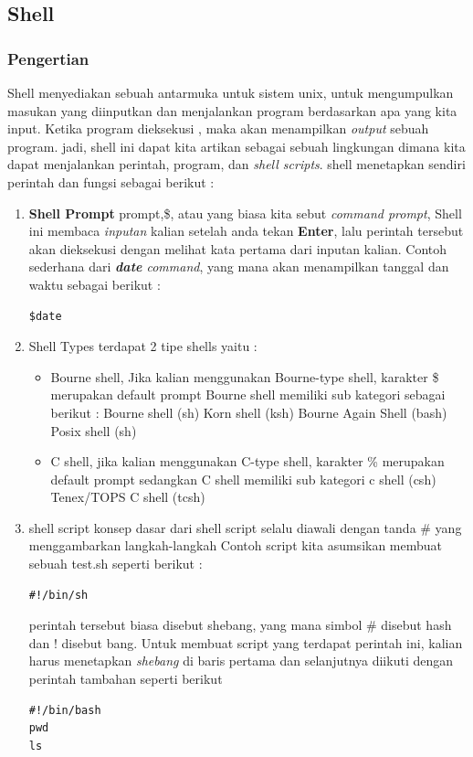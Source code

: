 \subsection{Shell}
\subsubsection{Pengertian}
Shell menyediakan sebuah antarmuka untuk sistem unix, untuk mengumpulkan masukan yang diinputkan dan menjalankan program berdasarkan apa yang kita input. Ketika program dieksekusi , maka akan menampilkan \textit{output} sebuah program. 
jadi, shell ini dapat kita artikan sebagai sebuah lingkungan dimana kita dapat menjalankan perintah, program, dan \textit{shell scripts}.
shell menetapkan sendiri perintah dan fungsi sebagai berikut :
\begin{enumerate}
\item \textbf{Shell Prompt}
prompt,\$, atau yang biasa kita sebut \textit{command prompt}, Shell ini membaca \textit{inputan} kalian setelah anda tekan \textbf{Enter}, lalu perintah tersebut akan dieksekusi dengan melihat kata pertama dari inputan kalian.
Contoh sederhana dari \textit{\textbf{date} command}, yang mana akan menampilkan tanggal dan waktu sebagai berikut :
\begin{verbatim}
$date
\end{verbatim}

\item{Shell Types}
terdapat 2 tipe shells yaitu :
\begin{itemize}
\item Bourne shell, Jika kalian menggunakan Bourne-type shell, karakter \$ merupakan default prompt 
Bourne shell memiliki sub kategori sebagai berikut :
\subitem Bourne shell (sh)
\subitem Korn shell (ksh)
\subitem Bourne Again Shell (bash)
\subitem Posix shell (sh)
\item C shell, jika kalian menggunakan C-type shell, karakter \% merupakan default prompt
 sedangkan C shell memiliki sub kategori 
\subitem c shell (csh)
\subitem Tenex/TOPS C shell (tcsh)
\end{itemize}

\item{shell script}
konsep dasar dari shell script selalu diawali dengan tanda \# yang menggambarkan langkah-langkah
Contoh script 
kita asumsikan membuat sebuah test.sh seperti berikut :
\begin{verbatim}
#!/bin/sh
\end{verbatim}
perintah tersebut biasa disebut shebang, yang mana simbol \# disebut hash dan ! disebut bang.
Untuk membuat script yang terdapat perintah ini, kalian harus menetapkan \textit{shebang} di baris pertama dan selanjutnya diikuti dengan perintah tambahan seperti berikut
\begin{verbatim}
#!/bin/bash
pwd
ls
\end{verbatim}
\end{enumerate}

